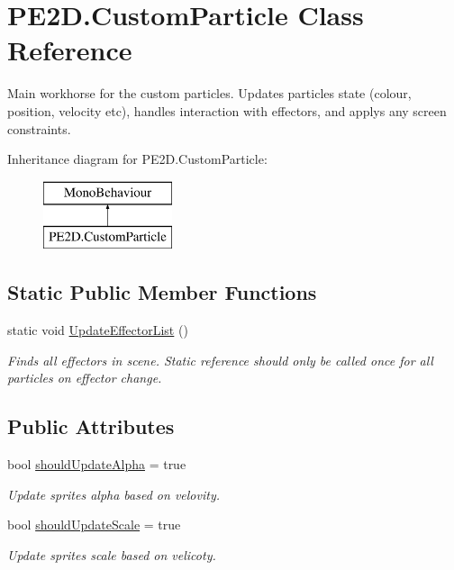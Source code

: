 \hypertarget{class_p_e2_d_1_1_custom_particle}{}\section{P\+E2\+D.\+Custom\+Particle Class Reference}
\label{class_p_e2_d_1_1_custom_particle}


Main workhorse for the custom particles. Updates particles state (colour, position, velocity etc), handles interaction with effectors, and applys any screen constraints.  


Inheritance diagram for P\+E2\+D.\+Custom\+Particle\+:\begin{figure}[H]
\begin{center}
\leavevmode
\includegraphics[height=2.000000cm]{class_p_e2_d_1_1_custom_particle}
\end{center}
\end{figure}
\subsection*{Static Public Member Functions}
\begin{DoxyCompactItemize}
\item 
static void \hyperlink{class_p_e2_d_1_1_custom_particle_aa49ae6d77d9160f453efa3826da35564}{Update\+Effector\+List} ()
\begin{DoxyCompactList}\small\item\em Finds all effectors in scene. Static reference should only be called once for all particles on effector change. \end{DoxyCompactList}\end{DoxyCompactItemize}
\subsection*{Public Attributes}
\begin{DoxyCompactItemize}
\item 
bool \hyperlink{class_p_e2_d_1_1_custom_particle_ad82465196a455ef29ff5c8e8c528c9b8}{should\+Update\+Alpha} = true
\begin{DoxyCompactList}\small\item\em Update sprites alpha based on velovity. \end{DoxyCompactList}\item 
bool \hyperlink{class_p_e2_d_1_1_custom_particle_a13a2f64584e65a38d7ec7b27f1d3fcd2}{should\+Update\+Scale} = true
\begin{DoxyCompactList}\small\item\em Update sprites scale based on velicoty. \end{DoxyCompactList}\end{DoxyCompactItemize}
